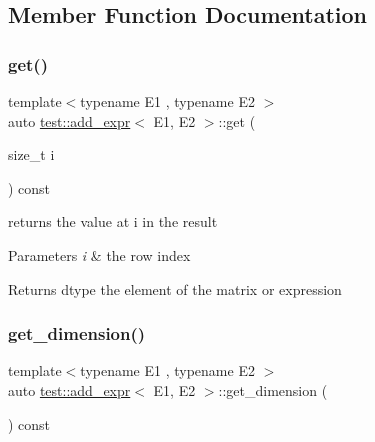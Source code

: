 \subsection{Member Function Documentation}
\mbox{\label{classtest_1_1add__expr_a21308cdf6f09407cbe087ae4bd77e341}} 
\subsubsection{\texorpdfstring{get()}{get()}}
{\footnotesize\ttfamily template$<$typename E1 , typename E2 $>$ \\
auto \mbox{\hyperlink{classtest_1_1add__expr}{test\+::add\+\_\+expr}}$<$ E1, E2 $>$\+::get (\begin{DoxyParamCaption}\item[{size\+\_\+t}]{i }\end{DoxyParamCaption}) const\hspace{0.3cm}{\ttfamily [inline]}}



returns the value at i in the result 


\begin{DoxyParams}{Parameters}
{\em i} & the row index \\
\hline
\end{DoxyParams}
\begin{DoxyReturn}{Returns}
dtype the element of the matrix or expression 
\end{DoxyReturn}
\mbox{\label{classtest_1_1add__expr_a6851920fd85d3dcbf8396f3c445b73a4}} 
\subsubsection{\texorpdfstring{get\_dimension()}{get\_dimension()}}
{\footnotesize\ttfamily template$<$typename E1 , typename E2 $>$ \\
auto \mbox{\hyperlink{classtest_1_1add__expr}{test\+::add\+\_\+expr}}$<$ E1, E2 $>$\+::get\+\_\+dimension (\begin{DoxyParamCaption}{ }\end{DoxyParamCaption}) const\hspace{0.3cm}{\ttfamily [inline]}}



